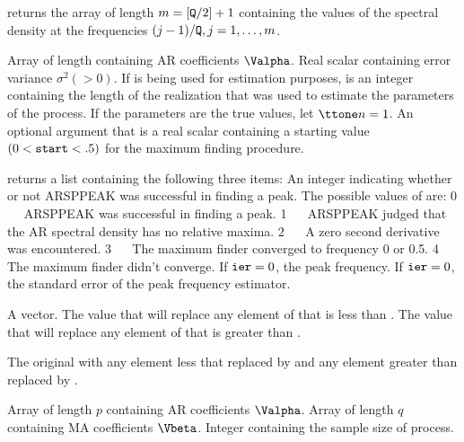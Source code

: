 \Sval
\Sitem{ }  returns the array {} of length 
$m=[{\tt{Q}}/2]+1$ containing the values of the spectral density at the 
frequencies $(j-1)/{\tt{Q}},j=1,\ldots,m$.
%
%


\Sarg
\Sval
{} Array of length {} containing AR coefficients
$\Valpha$.
 Real scalar containing error variance $\sigma^2(>0)$.
  If {} is being used for estimation purposes, 
{} is an integer containing the length of the realization that 
was used to estimate the parameters of the process.  If the
parameters are the true values, let ${\tsl{n}}=1$.
 An optional argument that is a real scalar
containing a starting value $(0<{\tt{start}}<.5)$ for the
maximum finding procedure. 

\Sval
\Sitem{ }  returns a list containing the following 
three items:
 An integer indicating whether or not ARSPPEAK was
successful in finding a peak.  The possible values of
{} are:
\Sitem{ } 0 ~~ ARSPPEAK was successful in finding a peak.
\Sitem{ } 1 ~~ ARSPPEAK judged that the AR spectral density
has no relative maxima.
\Sitem{ } 2 ~~ A zero second derivative was encountered.
\Sitem{ } 3 ~~ The maximum finder converged to frequency 0
or 0.5.
\Sitem{ } 4 ~~ The maximum finder didn't converge.
 If ${\tt{ier}}=0$, the peak frequency.
 If ${\tt{ier}}=0$, the standard error of the peak
frequency estimator.
%
%


\Sarg
{} A vector.
 The value that will replace any element of {} that is
less than {}.
 The value that will replace any element of {} that is 
greater than {}.

\Sval
{} The original {} with any element less that {} 
replaced by {} and any element greater than {} replaced 
by {}.
%
%


\Sarg
{} Array of length $p$ containing AR coefficients $\Valpha$.
 Array of length $q$ containing MA coefficients $\Vbeta$.
 Integer containing the sample size of process. 

